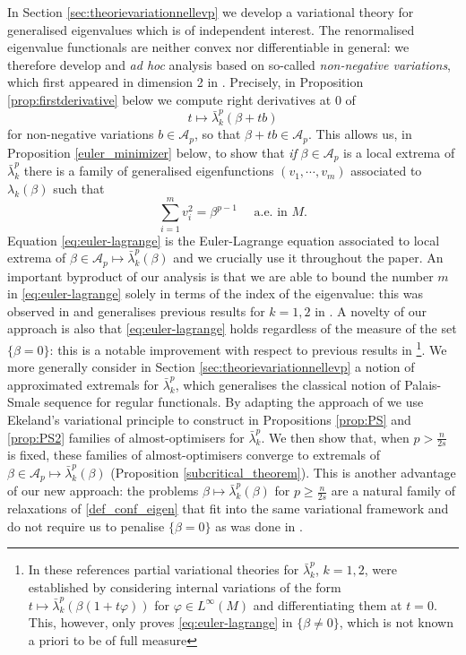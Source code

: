 \documentclass[10pt]{amsart}
\numberwithin{equation}{section}
\def\phi{{\varphi}}
\theoremstyle{plain}
\theoremstyle{remark}
\begin{document}
In Section \ref{sec:theorievariationnellevp} we develop a variational theory for generalised eigenvalues which is of independent interest. The renormalised eigenvalue functionals are neither convex nor differentiable in general: we therefore develop and \emph{ad hoc} analysis based on so-called \emph{non-negative variations}, which first appeared in dimension 2 in \cite{Petrides5,Petrides4}. Precisely, in Proposition \ref{prop:firstderivative} below we compute right derivatives at $0$ of 
$$t \mapsto \bar{\lambda}_k^p(\beta + t b)$$ for non-negative variations $b \in \mathcal{A}_p$, so that $ \beta + t b \in \mathcal{A}_p$. This allows us, in Proposition \ref{euler_minimizer} below, to show that \emph{if} $\beta \in \mathcal{A}_p$ is a local extrema of $ \bar{\lambda}_k^p$ there is a family of generalised eigenfunctions $(v_1,\cdots,v_m)$ associated to $\lambda_k(\beta)$ such that 
\begin{equation}\label{eq:euler-lagrange}
\sum_{i=1}^m v_i^2 = \beta^{p-1} \quad \text{ a.e. in } M. 
\end{equation}
Equation \eqref{eq:euler-lagrange} is the Euler-Lagrange equation associated to local extrema of $\beta \in \mathcal{A}_p \mapsto \bar{\lambda}_k^p(\beta)$ and we crucially use it throughout the paper. An important byproduct of our analysis is that we are able to bound the number $m$ in \eqref{eq:euler-lagrange} solely in terms of the index of the eigenvalue: this was observed in \cite{PetridesTewodrose} and generalises previous results for $k=1,2$ in \cite{AmmannHumbert,GurskyPerez}. A novelty of our approach is also that \eqref{eq:euler-lagrange} holds regardless of the measure of the set $\{ \beta = 0 \}$: this is a notable improvement with respect to previous results in \cite{AmmannHumbert,GurskyPerez}\footnote{In these references partial variational theories for $\bar{\lambda}_k^p$, $k=1,2$, were established by considering internal variations of the form $t \mapsto \bar{\lambda}_k^p(\beta (1+t \phi))$ for $\phi \in L^\infty(M)$ and differentiating them at $t=0$. This, however, only proves \eqref{eq:euler-lagrange} in $\{ \beta \neq 0 \}$, which is not known a priori to be of full measure}. We more generally consider in Section \ref{sec:theorievariationnellevp} a notion of approximated extremals for $\bar{\lambda}_k^p$, which generalises the classical notion of Palais-Smale sequence for regular functionals. By adapting the approach of  \cite{Petrides5, Petrides4} we use Ekeland's variational principle to construct in Propositions \ref{prop:PS} and \ref{prop:PS2}  families of almost-optimisers for $\bar{\lambda}_k^p$. We then show that, when $p > \frac{n}{2s}$ is fixed, these families of almost-optimisers converge to extremals of $\beta \in \mathcal{A}_p \mapsto \bar{\lambda}_k^p(\beta)$ (Proposition \ref{subcritical_theorem}). This is another advantage of our new approach: the problems $\beta \mapsto \bar{\lambda}_k^p(\beta)$ for $p \ge \frac{n}{2s}$ are a natural family of relaxations of \eqref{def_conf_eigen} that fit into the same variational framework and do not require us to penalise $\{\beta = 0 \}$ as was done in \cite{GurskyPerez}.
\end{document}
